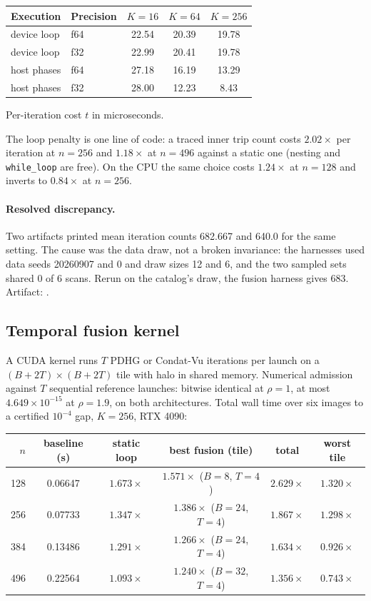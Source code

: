 \begin{center}
\small
\begin{tabular}{llccc}
\toprule
Execution & Precision & $K=16$ & $K=64$ & $K=256$ \\
\midrule
device loop & f64 & 22.54 & 20.39 & 19.78 \\
device loop & f32 & 22.99 & 20.41 & 19.78 \\
host phases & f64 & 27.18 & 16.19 & 13.29 \\
host phases & f32 & 28.00 & 12.23 & 8.43 \\
\bottomrule
\end{tabular}

Per-iteration cost $t$ in microseconds.
\end{center}

The loop penalty is one line of code: a traced inner trip count costs
$2.02\times$ per iteration at $n=256$ and $1.18\times$ at $n=496$ against a
static one (nesting and \texttt{while\_loop} are free). On the CPU the same
choice costs $1.24\times$ at $n=128$ and inverts to $0.84\times$ at $n=256$.

\paragraph{Resolved discrepancy.}
\label{app:log:a1}
Two artifacts printed mean iteration counts 682.667 and 640.0 for the same
setting. The cause was the data draw, not a broken invariance: the harnesses
used data seeds 20260907 and 0 and draw sizes 12 and 6, and the two sampled
sets shared 0 of 6 scans. Rerun on the catalog's draw, the fusion harness
gives 683. Artifact: .

\subsection{Temporal fusion kernel}
\label{app:log:fusion}

A CUDA kernel runs $T$ PDHG or Condat-Vu iterations per launch on a
$(B+2T)\times(B+2T)$ tile with halo in shared memory. Numerical admission
against $T$ sequential reference launches: bitwise identical at $\rho=1$, at
most $4.649\times10^{-15}$ at $\rho=1.9$, on both architectures. Total wall
time over six images to a certified $10^{-4}$ gap, $K=256$, RTX 4090:

\begin{center}
\small
\begin{tabular}{rccccc}
\toprule
$n$ & baseline (s) & static loop & best fusion (tile) & total & worst tile \\
\midrule
128 & 0.06647 & $1.673\times$ & $1.571\times$ ($B=8$, $T=4$) & $2.629\times$ & $1.320\times$ \\
256 & 0.07733 & $1.347\times$ & $1.386\times$ ($B=24$, $T=4$) & $1.867\times$ & $1.298\times$ \\
384 & 0.13486 & $1.291\times$ & $1.266\times$ ($B=24$, $T=4$) & $1.634\times$ & $0.926\times$ \\
496 & 0.22564 & $1.093\times$ & $1.240\times$ ($B=32$, $T=4$) & $1.356\times$ & $0.743\times$ \\
\bottomrule
\end{tabular}
\end{center}

